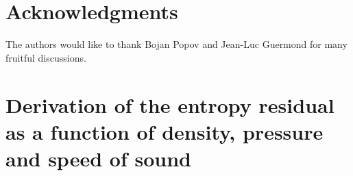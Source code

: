 \documentclass[preprint,10pt]{elsarticle}
\begin{document}

\section*{Acknowledgments} 
The authors would like to thank Bojan Popov and Jean-Luc Guermond for many fruitful discussions.  


\newpage
\appendix

\section{Derivation of the entropy residual as a function of density, pressure and speed of sound} \label{app:ent_res}
\end{document}
